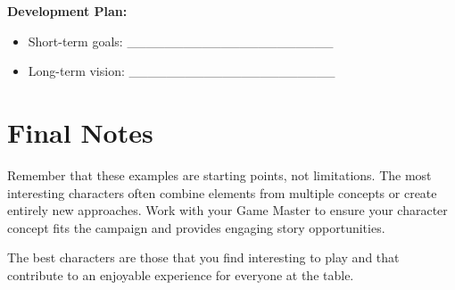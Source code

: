 \begin{multicols}{2}
\begin{tcolorbox}[colback=green!5!white,colframe=green!75!black,title=Character Concept Worksheet,fonttitle=\bfseries]
\textbf{Development Plan:}
\begin{itemize}
\item Short-term goals: \_\_\_\_\_\_\_\_\_\_\_\_\_\_\_\_\_\_\_\_\_\_
\item Long-term vision: \_\_\_\_\_\_\_\_\_\_\_\_\_\_\_\_\_\_\_\_\_\_
\end{itemize}
\end{tcolorbox}

\section{Final Notes}

Remember that these examples are starting points, not limitations. The most interesting characters often combine elements from multiple concepts or create entirely new approaches. Work with your Game Master to ensure your character concept fits the campaign and provides engaging story opportunities.

The best characters are those that you find interesting to play and that contribute to an enjoyable experience for everyone at the table.

\end{multicols}

